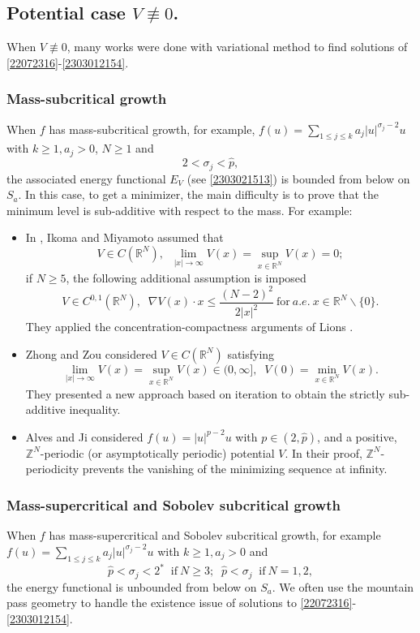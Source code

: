 \documentclass[10pt]{article}
\numberwithin{equation}{section}
\numberwithin{equation}{section}
\begin{document}
\subsection{Potential case $V\not\equiv 0$.}
When $V \not\equiv 0$, many works were done with variational method to find solutions of \eqref{22072316}-\eqref{2303012154}.
\subsubsection{Mass-subcritical growth}
When $f$ has mass-subcritical growth, for example, $f(u)=\sum_{1\leq j\leq k}a_j|u|^{\sigma_j-2}u$ with $k\ge 1, a_j>0$, $N\geq 1$ and
\[
2<\sigma_j<\hat{p},
\]
the associated energy functional $E_V$ (see \eqref{2303021513}) is bounded from below on $S_a$. In this case, to get a minimizer, the main difficulty is to prove that the minimum level is sub-additive with respect to the mass. For example:

\begin{itemize}
\item In \cite{IM2020}, Ikoma and Miyamoto assumed that
\[
V\in C(\mathbb{R}^N),\;\; \underset{|x|\to \infty}{\lim}V(x)=\underset{x\in \mathbb{R}^N}{\sup}V(x)=0;
\]
if $N\ge 5$, the following additional assumption is imposed
\[
 V\in C^{0, 1}(\mathbb{R}^N),\;\; \nabla V(x)\cdot x\le \frac{(N-2)^2}{2|x|^2} ~\text{for}~a.e.~x\in \mathbb{R}^N\backslash \{0\}.
\]
They applied the concentration-compactness arguments of Lions \cite{Lions84-1, Lions84-2}.
\item Zhong and Zou \cite{ZZ2021} considered $V\in C(\mathbb{R}^N)$ satisfying
\[
\underset{|x|\to \infty}{\lim}V(x)=\underset{x\in \mathbb{R}^N}{\sup}V(x)\in (0, \infty],\;\; V(0)=\underset{x\in \mathbb{R}^N}{\min}V(x).
\]
They presented a new approach based on iteration to obtain the strictly sub-additive inequality.
\item Alves and Ji \cite{CJ2022} considered $f(u)=|u|^{p-2}u$ with $p\in (2, \hat{p})$, and a positive, ${\mathbb Z}^N$-periodic (or asymptotically periodic) potential $V$. In their proof, ${\mathbb Z}^N$-periodicity prevents the vanishing of the minimizing sequence at infinity.
\end{itemize}

\subsubsection{Mass-supercritical and Sobolev subcritical growth} When $f$ has mass-supercritical and Sobolev subcritical growth, for example $f(u)=\sum_{1\leq j \leq k}a_j|u|^{\sigma_j-2}u$ with $k\ge 1, a_j>0$ and
\[
\hat{p}<\sigma_j<2^* \;\;\text{if}~N\ge 3;\;\;\hat{p}<\sigma_j\;\;\text{if}~N=1, 2,
\]
the energy functional is unbounded from below on $S_a$. We often use the mountain pass geometry to handle the existence issue of solutions to \eqref{22072316}-\eqref{2303012154}.
\end{document}
